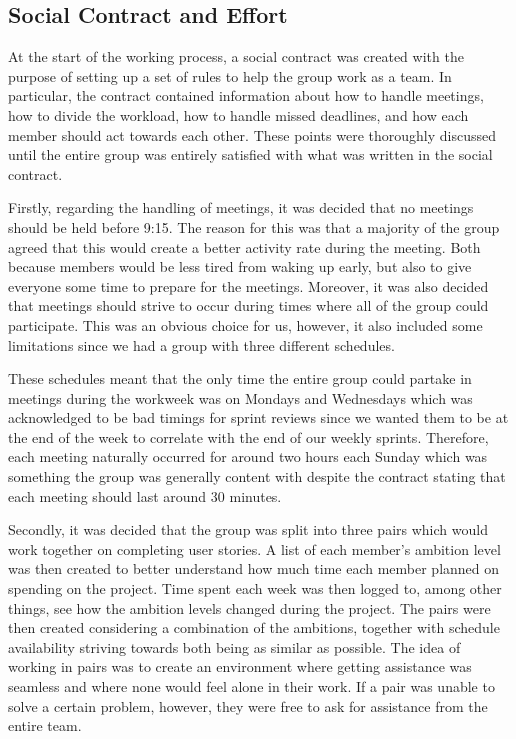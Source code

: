 \subsection {Social Contract and Effort}
At the start of the working process, a social contract was created with the purpose of setting up a set of rules to help the group work as a team. In particular, the contract contained information about how to handle meetings, how to divide the workload, how to handle missed deadlines, and how each member should act towards each other. These points were thoroughly discussed until the entire group was entirely satisfied with what was written in the social contract. 

Firstly, regarding the handling of meetings, it was decided that no meetings should be held before 9:15. The reason for this was that a majority of the group agreed that this would create a better activity rate during the meeting. Both because members would be less tired from waking up early, but also to give everyone some time to prepare for the meetings. Moreover, it was also decided that meetings should strive to occur during times where all of the group could participate. This was an obvious choice for us, however, it also included some limitations since we had a group with three different schedules. 

These schedules meant that the only time the entire group could partake in meetings during the workweek was on Mondays and Wednesdays which was acknowledged to be bad timings for sprint reviews since we wanted them to be at the end of the week to correlate with the end of our weekly sprints. Therefore, each meeting naturally occurred for around two hours each Sunday which was something the group was generally content with despite the contract stating that each meeting should last around 30 minutes.  

Secondly, it was decided that the group was split into three pairs which would work together on completing user stories. A list of each member’s ambition level was then created to better understand how much time each member planned on spending on the project. Time spent each week was then logged to, among other things, see how the ambition levels changed during the project. The pairs were then created considering a combination of the ambitions, together with schedule availability striving towards both being as similar as possible. The idea of working in pairs was to create an environment where getting assistance was seamless and where none would feel alone in their work. If a pair was unable to solve a certain problem, however, they were free to ask for assistance from the entire team.

